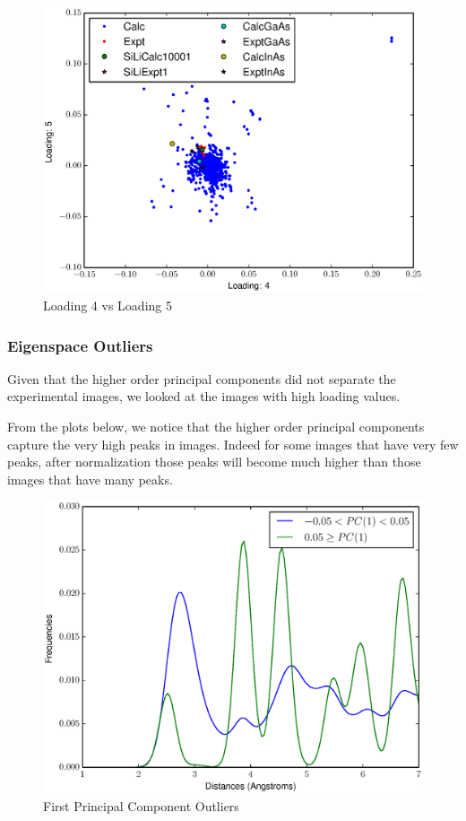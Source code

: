 \documentclass[12pt,letterpaper]{article}
\begin{document}
\begin{figure}[ht]
  \begin{center}
    \includegraphics[scale=0.8]{figs/eigenspace4-5.eps}
    \caption{Loading 4 vs  Loading 5}
  \end{center}
\end{figure}
\clearpage

\subsubsection{Eigenspace Outliers}
Given that the higher order principal components did not separate the
experimental images, we looked at the images with high loading values. 

From the plots below, we notice that the higher order principal components
capture the very high peaks in images. Indeed for some images that have very few
peaks, after normalization those peaks will become much higher than those images
that have many peaks.

\begin{figure}[ht]
  \begin{center}
    \includegraphics[scale=0.8]{figs/eigenOutlier1.eps}
    \caption{First Principal Component Outliers}
  \end{center}
\end{figure}
\end{document}
